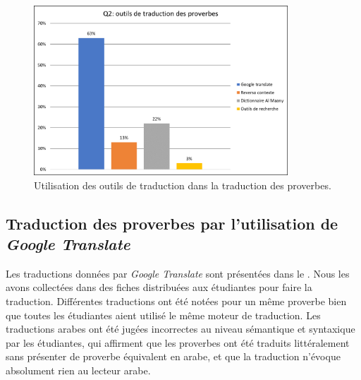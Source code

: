 \documentclass[french]{textolivre}
\begin{document}
\begin{figure}[htbp]
 \centering
 \includegraphics[width=0.85\textwidth]{Fig2.png}
 \caption{Utilisation des outils de traduction dans la traduction des proverbes.}
 \label{fig2}
\end{figure}

\subsection{Traduction des proverbes par l’utilisation de \textit{Google Translate}}\label{sec-modelo}
Les traductions données par \textit{Google Translate} sont présentées dans le . Nous les avons collectées dans des fiches distribuées aux étudiantes pour faire la traduction. Différentes traductions ont été notées pour un même proverbe bien que toutes les étudiantes aient utilisé le même moteur de traduction. Les traductions arabes ont été jugées incorrectes au niveau sémantique et syntaxique par les étudiantes, qui affirment que les proverbes ont été traduits littéralement sans présenter de proverbe équivalent en arabe, et que la traduction n’évoque absolument rien au lecteur arabe.
\end{document}
